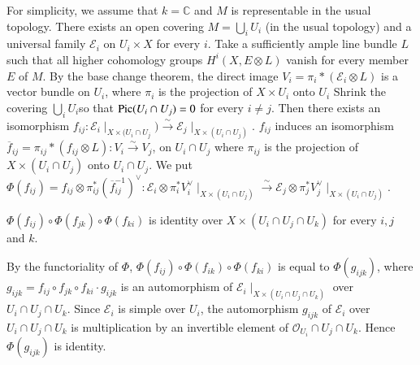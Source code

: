 \begin{Proof}
For simplicity, we assume that $k=\mathbb{C}$ and $M$ is representable
in the usual topology. There exists an open covering
$M=\bigcup\limits_{i}U_i$ (in the usual topology) and a universal
family $\mathscr{E}_i$ on $U_i\times X$ for every $i$. Take a
sufficiently ample line bundle $L$ such that all higher cohomology
groups $H^{i}(X,E\otimes L)$ vanish for every member $E$ of $M$. By
the base change theorem, the direct image
$V_i=\pi_i\ast(\mathscr{E}_i\otimes L)$ is a vector bundle on $U_i$,
where $\pi_i$ is the projection of $X\times U_i$ onto $U_i$ Shrink the
covering $\bigcup\limits_{i} U_i$\pageoriginale so that $\mathrm{Pic} (U_i\cap U_j)=0$ for
every $i\neq j$. Then there exists an isomorphism
$f_{ij}:\mathscr{E}_i\mid_{X\times (U_i\cap
U_j})\xrightarrow{\sim}\mathscr{E}_j\mid_{X\times (U_i\cap
U_j)}$. $f_{ij}$ induces an isomorphism
$\overline{f}_{ij}=\pi_{ij}\ast (f_{ij}\otimes
L):V_i\xrightarrow{\sim}V_j$, on $U_i\cap U_j$ where $\pi_{ij}$ is the
projection of $X\times (U_i\cap U_j)$ onto $U_i\cap U_j$. We put
$\Phi(f_{ij})=f_{ij}\otimes \pi^{\ast}_{ij}\left(\overline{f}^{-1}_{ij}\right)^{\vee}:\mathscr{E}_i\otimes
\pi^{\ast}_iV_i^{\vee}\mid_{X\times (U_i\cap
U_j)}\xrightarrow{\sim}\mathscr{E}_j\otimes \pi^{\ast}_jV^{\vee}_j\mid_{X\times
(U_i\cap U_j)}$.

\begin{claim}
$\Phi (f_{ij})\circ \Phi(f_{jk})\circ \Phi(f_{ki})$ is identity over
$X\times (U_i\cap U_j\cap U_k)$ for every $i,j$ and $k$. 
\end{claim}

By the functoriality of $\Phi$,
$\Phi(f_{ij})\circ \Phi(f_{ik})\circ \Phi(f_{ki})$ is equal to
$\Phi(g_{ijk})$, where $g_{ijk}=f_{ij}\circ f_{jk}\circ f_{ki}\cdot
g_{ijk}$ is an automorphism  of $\mathscr{E}_i\mid_{X\times (U_i\cap
U_j\cap U_k)}$ over $U_i\cap U_j\cap U_k$. Since $\mathscr{E}_i$ is
simple over $U_i$, the automorphism $g_{ijk}$ of $\mathscr{E}_i$ over
$U_i\cap U_j\cap U_k$ is multiplication by an invertible element of
$\mathscr{O}_{U_{i}}\cap U_j \cap U_k$. Hence $\Phi(g_{ijk})$ is
identity.


\end{Proof}
